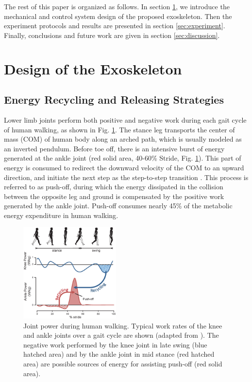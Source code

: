 \documentclass[10pt]{asme2ej}
\begin{document}
The rest of this paper is organized as follows.
In section \ref{sec:design}, we introduce the mechanical and control system design of the proposed exoskeleton.
Then the experiment protocols and results are presented in section \ref{sec:experiment}.
Finally, conclusions and future work are given in section \ref{sec:discussion}.


\section{Design of the Exoskeleton}
\label{sec:design}

\subsection{Energy Recycling and Releasing Strategies}
\label{subsec:Biomechanics}

Lower limb joints perform both positive and negative work during each gait cycle of human walking, as shown in Fig. \ref{fig:work}.
The stance leg transports the center of mass (COM) of human body along an arched path, which is usually modeled as an inverted pendulum\cite{RN13}.
Before toe off, there is an intensive burst of energy generated at the ankle joint (red solid area, 40-60\% Stride, Fig. \ref{fig:work}).
This part of energy is consumed to redirect the downward velocity of the COM to an upward direction, and initiate the next step as the step-to-step transition \cite{RN14,wu2016effects}.
This process is referred to as push-off, during which the energy dissipated in the collision between the opposite leg and ground is compensated by the positive work generated by the ankle joint.
Push-off consumes nearly 45\% of the metabolic energy expenditure in human walking\cite{RN15}.

\begin{figure}[b]
	\centering
	\includegraphics[width=0.45\textwidth]{Figure1.eps}
	\caption{Joint power during human walking.
	Typical work rates of the knee and ankle joints over a gait cycle are shown (adapted from \cite{RN2}).
	The negative work performed by the knee joint in late swing (blue hatched area) and by the ankle joint in mid stance (red hatched area) are possible sources of energy for assisting push-off (red solid area).}
	\label{fig:work}
\end{figure}
\end{document}
